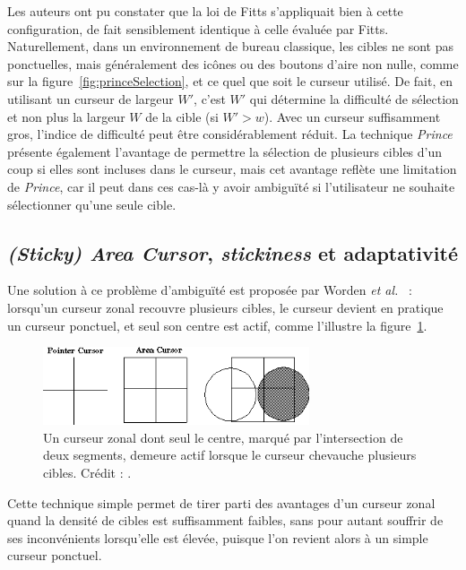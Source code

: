 \begin{appendices}
	Les auteurs ont pu constater que la loi de Fitts s'appliquait bien à cette configuration, de fait sensiblement identique à celle évaluée par Fitts. Naturellement, dans un environnement de bureau classique, les cibles ne sont pas ponctuelles, mais généralement des icônes ou des boutons d'aire non nulle, comme sur la figure~\ref{fig:princeSelection}, et ce quel que soit le curseur utilisé. De fait, en utilisant un curseur de largeur $W'$, c'est $W'$ qui détermine la difficulté de sélection et non plus la largeur $W$ de la cible (si $W' > w$). Avec un curseur suffisamment gros, l'indice de difficulté peut être considérablement réduit. La technique \emph{Prince} présente également l'avantage de permettre la sélection de plusieurs cibles d'un coup si elles sont incluses dans le curseur, mais cet avantage reflète une limitation de \emph{Prince}, car il peut dans ces cas-là y avoir ambiguïté si l'utilisateur ne souhaite sélectionner qu'une seule cible.
	
	\subsection{\emph{(Sticky) Area Cursor}, \emph{stickiness} et adaptativité}
	\label{sub:areaCursor}
	Une solution à ce problème d'ambiguïté est proposée par Worden \emph{et al.}~\cite{worden1997making} : lorsqu'un curseur zonal recouvre plusieurs cibles, le curseur devient en pratique un curseur ponctuel, et seul son centre est actif, comme l'illustre la figure~\ref{fig:areaCursor}.
	
	\begin{figure}[htbp]
		\centering
		\includegraphics[width=0.70\textwidth]{figures/ch2/areaCursor}
		\caption[\emph{Area Cursor} avec \emph{hot spot}]{Un curseur zonal dont seul le centre, marqué par l'intersection de deux segments, demeure actif lorsque le curseur chevauche plusieurs cibles. Crédit : \cite{worden1997making}.}
		\label{fig:areaCursor}
	\end{figure}
	
	Cette technique simple permet de tirer parti des avantages d'un curseur zonal quand la densité de cibles est suffisamment faibles, sans pour autant souffrir de ses inconvénients lorsqu'elle est élevée, puisque l'on revient alors à un simple curseur ponctuel.
	

\end{appendices}
